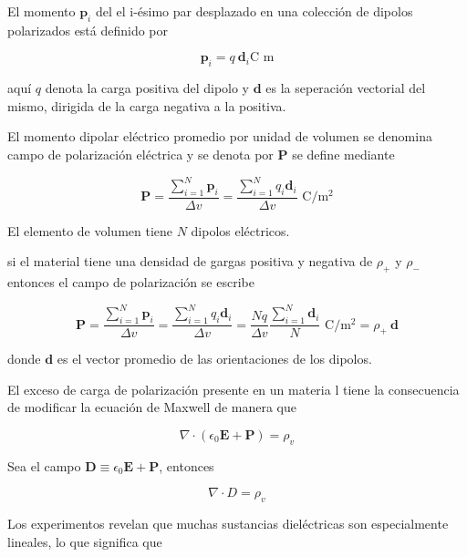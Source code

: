 El momento $\mathbf{p}_i$ del el i-ésimo par desplazado en una colección de dipolos polarizados está definido por

\begin{equation*}
\mathbf{p}_i = q \ \mathbf{d}_i \text{C \ m}
\end{equation*}

aquí $q$ denota la carga positiva del dipolo y $\mathbf{d}$ es la seperación vectorial del mismo, dirigida de la carga negativa a la positiva.

El momento dipolar eléctrico promedio por unidad de volumen se denomina campo de polarización eléctrica y se denota por $\mathbf{P}$ se define mediante

\begin{equation*}
\mathbf{P} = \frac{\sum_{i=1}^{N}\mathbf{p}_i}{\Delta v} = \frac{\sum_{i=1}^{N} q_i \mathbf{d}_i}{\Delta v} \text{ C/} \text{m}^2
\end{equation*}

El elemento de volumen tiene $N$ dipolos eléctricos.

si el material tiene una densidad de gargas positiva y negativa de $\rho_+$ y $\rho_-$ entonces el campo de polarización se escribe


\begin{equation*}
\mathbf{P} = \frac{\sum_{i=1}^{N}\mathbf{p}_i}{\Delta v} = \frac{\sum_{i=1}^{N} q_i \mathbf{d}_i}{\Delta v} = \frac{N q}{\Delta v} \frac{\sum_{i=1}^{N} \mathbf{d}_i}{N} \text{ C/} \text{m}^2 = \rho_+ \ \mathbf{d}
\end{equation*}


donde $\mathbf{d}$ es el vector promedio de las orientaciones de los dipolos.

El exceso de carga de polarización presente en un materia l tiene la consecuencia de modificar la ecuación de Maxwell de manera que 

\begin{equation*}
\nabla \cdot (\epsilon_0 \mathbf{ \mathbf{E} + \mathbf{P}}) = \rho_v
\end{equation*}

Sea el campo $\mathbf{D}\equiv \epsilon_0 \mathbf{E} + \mathbf{P}$, entonces


\begin{equation*}
\nabla \cdot D = \rho_v
\end{equation*}

Los experimentos revelan que muchas sustancias dieléctricas son especialmente lineales, lo que significa que 


